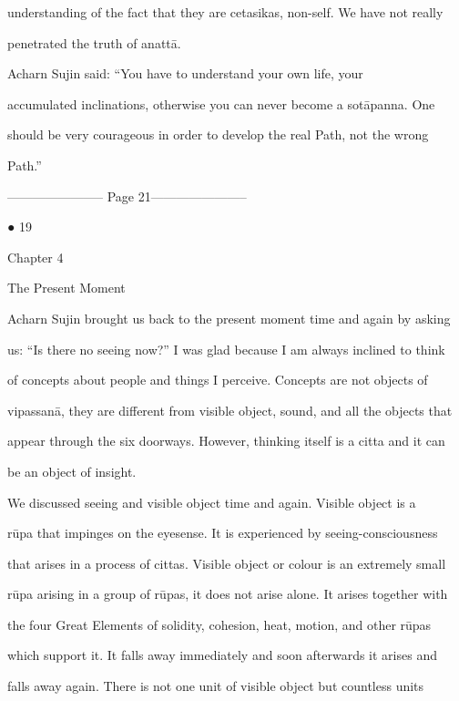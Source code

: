 understanding of the fact that they are cetasikas, non-self. We have not really  

penetrated the truth of anattā. 

   Acharn   Sujin   said:   “You   have   to   understand   your   own   life,   your  

accumulated inclinations, otherwise you can never become a  sotāpanna. One  

should be very  courageous  in  order to  develop the  real Path,  not the wrong  

Path.” 


----------------------- Page 21-----------------------

                                                                                     ● 19 



Chapter 4 



The Present Moment 



Acharn Sujin brought us back to the present moment time and again by asking  

us: “Is there no seeing now?” I was glad because I am always inclined to think  

of  concepts  about  people  and  things  I  perceive.  Concepts  are  not  objects  of  

vipassanā, they are different from visible object, sound, and all the objects that  

appear through the six doorways. However, thinking itself is a citta and it can  

be an object of insight. 

   We  discussed  seeing  and visible  object  time  and  again. Visible   object  is  a  

rūpa that impinges on the eyesense. It is experienced by seeing-consciousness  

that arises in a process of cittas. Visible object or colour is an extremely small  

rūpa arising in a group of rūpas, it does not arise alone. It arises together with  

the  four  Great  Elements  of  solidity,  cohesion, heat,  motion,  and  other  rūpas  

which support it. It falls away immediately and soon afterwards it arises and  

falls  away  again.  There  is  not  one  unit  of visible  object but  countless  units  

